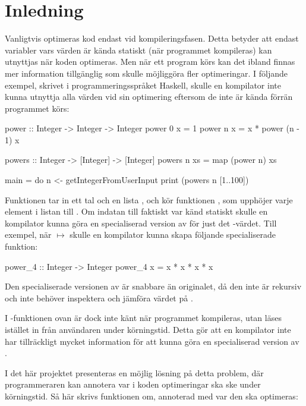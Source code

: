 \documentclass[Rapport]{subfiles}
\begin{document}
\section{Inledning}

Vanligtvis optimeras kod endast vid kompileringsfasen. Detta betyder att endast variabler
vars värden är kända statiskt (när programmet kompileras) kan utnyttjas när koden optimeras. Men när ett program 
körs kan det ibland finnas mer information tillgänglig som skulle möjliggöra 
fler optimeringar. I följande exempel, skrivet
i programmeringsspråket Haskell, skulle en kompilator inte kunna
utnyttja alla värden vid sin optimering eftersom de inte är kända förrän programmet körs:

\begin{codeEx}
power :: Integer -> Integer -> Integer
power 0 x = 1
power n x = x * power (n - 1) x

powers :: Integer -> [Integer] -> [Integer]
powers n xs = map (power n) xs

main = do
    n <- getIntegerFromUserInput
    print (powers n [1..100])

\end{codeEx}

Funktionen  tar in ett tal 
och en lista , och kör funktionen , 
som upphöjer varje element i listan till . 
Om indatan  till 
 faktiskt var känd statiskt skulle en kompilator kunna 
göra en specialiserad version av  för just det -värdet. Till exempel, när  $\mapsto$ 
skulle en kompilator kunna skapa följande specialiserade funktion:

\begin{codeEx}
power_4 :: Integer -> Integer
power_4 x = x * x * x * x
\end{codeEx}

Den specialiserade versionen av  är snabbare än originalet, då den inte är 
rekursiv och inte behöver inspektera och jämföra värdet på .

I -funktionen ovan är dock  inte känt när programmet kompileras, utan läses 
istället in från användaren under körningstid. Detta gör att en kompilator inte 
har tillräckligt mycket information för att kunna göra en specialiserad version av .

I det här projektet presenteras en möjlig lösning på detta problem,
där programmeraren kan annotera var i koden optimeringar ska ske under körningstid.
Så här skrivs funktionen  om,
annoterad med var den ska optimeras:
\end{document}
